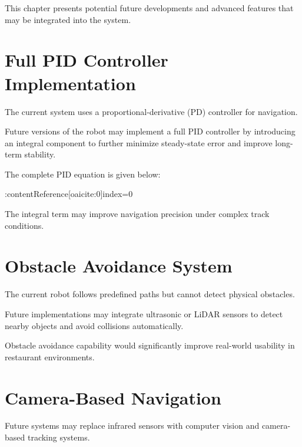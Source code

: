 \documentclass[12pt,a4paper,oneside]{report}
\begin{document}
This chapter presents potential future developments and advanced features that may be integrated into the system.


\section{Full PID Controller Implementation}

The current system uses a proportional-derivative (PD) controller for navigation.

Future versions of the robot may implement a full PID controller by introducing an integral component to further minimize steady-state error and improve long-term stability.

The complete PID equation is given below:

:contentReference[oaicite:0]{index=0}

The integral term may improve navigation precision under complex track conditions.


\section{Obstacle Avoidance System}

The current robot follows predefined paths but cannot detect physical obstacles.

Future implementations may integrate ultrasonic or LiDAR sensors to detect nearby objects and avoid collisions automatically.

Obstacle avoidance capability would significantly improve real-world usability in restaurant environments.


\section{Camera-Based Navigation}

Future systems may replace infrared sensors with computer vision and camera-based tracking systems.
\end{document}
